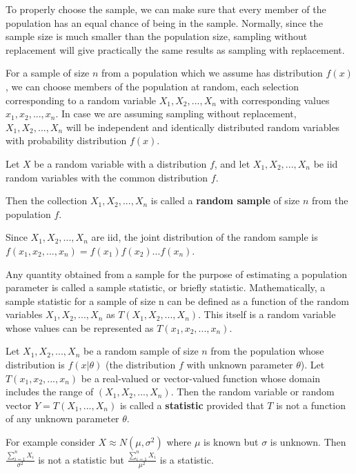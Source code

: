 To properly choose the sample, we can make sure that every member of the population has an equal chance of being in the sample.
Normally, since the sample size is much smaller than the population size, sampling without replacement will give practically the same results as sampling with replacement.

For a sample of size $n$ from a population which we assume has distribution $f(x)$, we can choose members of the population at random, each selection corresponding to a random variable $X_1, X_2, ..., X_n$ with corresponding values $x_1, x_2, ..., x_n$. In case we are assuming sampling without replacement, $X_1, X_2, ..., X_n$ will be independent and identically distributed random variables with probability distribution $f(x)$.

\begin{defn}
Let $X$ be a random variable with a distribution $f$, and let $X_1, X_2, ..., X_n$ be iid random variables with the common distribution $f$.

Then the collection $X_1, X_2, ..., X_n$ is called a \textbf{random sample} of size $n$ from the population $f$.
\end{defn}

Since $X_1, X_2, ..., X_n$ are iid, the joint distribution of the random sample is $f(x_1, x_2, ..., x_n) = f(x_1) f(x_2) ... f(x_n)$.

Any quantity obtained from a sample for the purpose of estimating a population parameter is called a sample
statistic, or briefly statistic. Mathematically, a sample statistic for a sample of size n can be defined as a function of the random variables $X_1, X_2, ..., X_n$ as $T(X_1, X_2, ..., X_n)$. This itself is a random variable whose values can be represented as $T(x_1, x_2, ..., x_n)$.

\begin{defn}[Statistic]
    Let $X_1, X_2, ..., X_n$ be a random sample of size $n$ from the population whose distribution is $f\left (x|\theta\right )$ (the distribution $f$ with unknown parameter $\theta$). Let $T\left (x_1, x_2, ...,x_n\right )$ be a real-valued or vector-valued function whose domain includes the range of $\left (X_1, X_2, ..., X_n\right )$. Then the random variable or random vector $Y = T\left (X_1, ..., X_n\right )$ is called a \textbf{statistic} provided that $T$ is not a function of any unknown parameter $\theta$.
\end{defn}

For example consider $X \approx N(\mu, \sigma^2)$ where $\mu$ is known but $\sigma$ is unknown. Then $\frac{\sum_{i=1}^n X_i}{\sigma^2}$ is not a statistic but $\frac{\sum_{i=1}^n X_i}{\mu^2}$ is a statistic.

